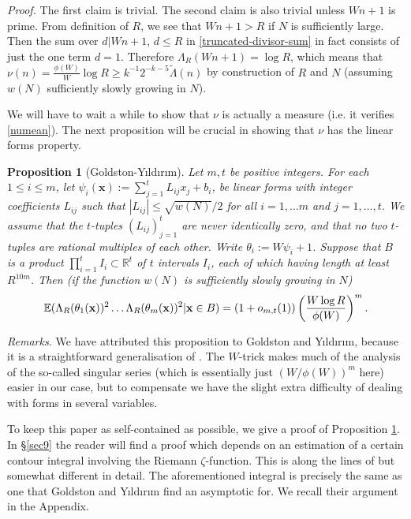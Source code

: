 \documentclass[12pt,a4paper,reqno]{amsart}
\numberwithin{equation}{section}
\theoremstyle{plain}
\newtheorem{proposition}[subsection]{Proposition}
\theoremstyle{definition}
\renewcommand{\leq}{\leqslant}
\renewcommand{\geq}{\geqslant}
\def\E{{\mathbb E}}
\def\R{{\mathbb R}}
\def\x{{\bf x}}
\def\w{w}
\def\vs{\vspace{11pt}}
\def\ni{\noindent}
\def\proof{\noindent\textit{Proof. }}
\def\endproof{\hfill{\usebox{\proofbox}}}
\begin{document}
\proof The first claim is trivial. The second claim is also trivial unless $Wn+1$ is prime.  From definition of $R$, we see that $Wn+1 > R$ if
$N$ is sufficiently large.  Then the sum over $d | Wn + 1$, $d \leq R$ in \eqref{truncated-divisor-sum} in fact consists of just the one term $d = 1$. Therefore $\Lambda_R(Wn + 1) = \log R$, which means that $\nu(n) = \frac{\phi(W)}{W}\log R \geq k^{-1}2^{-k-5} \widetilde{\Lambda}(n)$
by construction of $R$ and $N$ (assuming $\w(N)$ sufficiently slowly growing in $N$).
\endproof\vspace{11pt}

\ni We will have to wait a while to show that $\nu$ is actually a measure (i.e. it verifies \eqref{numean}). The next proposition will be crucial in showing that $\nu$ has the linear forms property.

\begin{proposition}[Goldston-Y{\i}ld{\i}r{\i}m]\label{GY}  Let $m, t$ be positive integers.  For each $1 \leq i \leq m$, let
$\psi_i(\mathbf{x}) := \sum_{j=1}^t L_{ij} x_j + b_i$, be linear forms with integer coefficients $L_{ij}$ such that $|L_{ij}| \leq \sqrt{\w(N)}/2$ for all $i = 1,\ldots m$ and $j=1,\ldots,t$. We assume that the $t$-tuples $(L_{ij})_{j=1}^t$ are never identically zero, and that no two $t$-tuples
are rational multiples of each other.
Write $\theta_i := W\psi_i + 1$.  Suppose that $B$ is a product $\prod_{i = 1}^t I_i \subset \R^t$ of $t$ intervals $I_i$, each of which having length  at least $R^{10m}$. Then \textup{(}if the function $\w(N)$ is sufficiently slowly growing in $N$\textup{)}
\[ \E( \Lambda_R(\theta_1(\mathbf{x}))^2 \dots \Lambda_R(\theta_m(\mathbf{x}))^2 | \x \in B ) = 
(1 + o_{m,t}(1)) \left(\frac{W \log R}{\phi(W)}\right)^m.
\]
\end{proposition}
\noindent\textit{Remarks.} We have attributed this proposition to Goldston and Y{\i}ld{\i}r{\i}m, because it is a straightforward generalisation of \cite[Proposition 2]{goldston-yildirim}. The $W$-trick makes much of the analysis of the so-called singular series (which is essentially just $(W/\phi(W))^m$ here) easier in our case, but to compensate we have the slight extra difficulty of dealing with forms in several variables.\vs

\ni To keep this paper as self-contained as possible, we give a proof of Proposition \ref{GY}. In \S \ref{sec9} the reader will find a proof which depends on an estimation of a certain contour integral involving the Riemann $\zeta$-function. This is along the lines of \cite[Proposition 2]{goldston-yildirim} but somewhat different in detail. The aforementioned integral is precisely the same as one that Goldston and Y{\i}ld{\i}r{\i}m find an asymptotic for. We recall their argument in the Appendix.\vs
\end{document}
